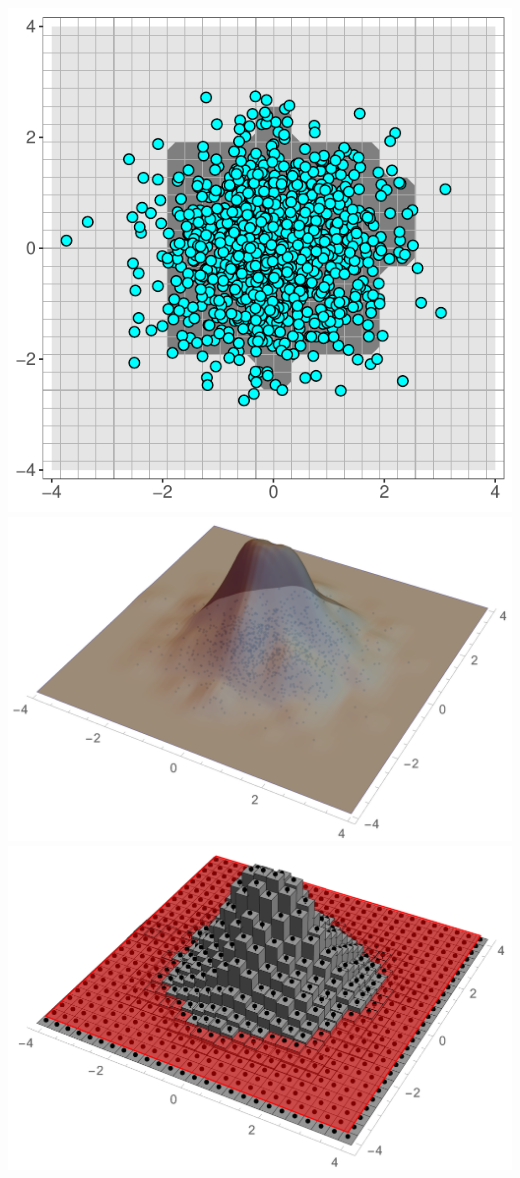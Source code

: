 \begin{widefigure}[h!]
  \includegraphics[scale=.357]{figures/fhat-hist-5.pdf} \\
  \includegraphics[scale=.225]{figures/fhat-kde-1.pdf}
  \includegraphics[scale=.225]{figures/fhat-kde-3.pdf}

\end{widefigure}
